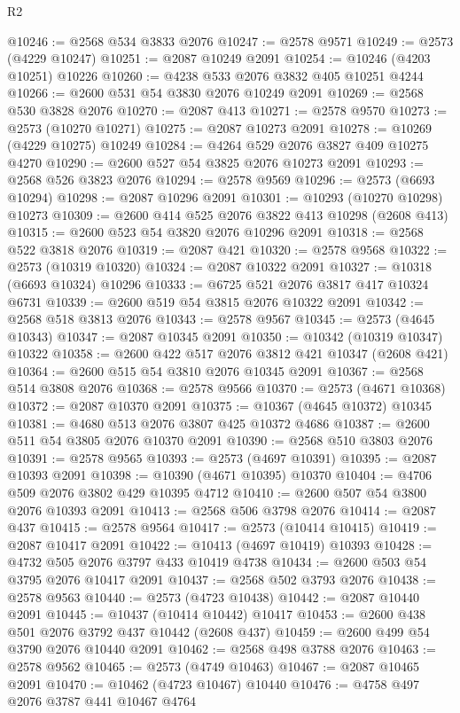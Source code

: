 \begin{lexlean}{R2}
\begin{coremodule}
@10246 := @2568 @534 @3833 @2076
@10247 := @2578 @9571
@10249 := @2573 (@4229 @10247)
@10251 := @2087 @10249 @2091
@10254 := @10246 (@4203 @10251) @10226
@10260 := @4238 @533 @2076 @3832 @405 @10251 @4244
@10266 := @2600 @531 @54 @3830 @2076 @10249 @2091
@10269 := @2568 @530 @3828 @2076
@10270 := @2087 @413
@10271 := @2578 @9570
@10273 := @2573 (@10270 @10271)
@10275 := @2087 @10273 @2091
@10278 := @10269 (@4229 @10275) @10249
@10284 := @4264 @529 @2076 @3827 @409 @10275 @4270
@10290 := @2600 @527 @54 @3825 @2076 @10273 @2091
@10293 := @2568 @526 @3823 @2076
@10294 := @2578 @9569
@10296 := @2573 (@6693 @10294)
@10298 := @2087 @10296 @2091
@10301 := @10293 (@10270 @10298) @10273
@10309 := @2600 @414 @525 @2076 @3822 @413 @10298 (@2608 @413)
@10315 := @2600 @523 @54 @3820 @2076 @10296 @2091
@10318 := @2568 @522 @3818 @2076
@10319 := @2087 @421
@10320 := @2578 @9568
@10322 := @2573 (@10319 @10320)
@10324 := @2087 @10322 @2091
@10327 := @10318 (@6693 @10324) @10296
@10333 := @6725 @521 @2076 @3817 @417 @10324 @6731
@10339 := @2600 @519 @54 @3815 @2076 @10322 @2091
@10342 := @2568 @518 @3813 @2076
@10343 := @2578 @9567
@10345 := @2573 (@4645 @10343)
@10347 := @2087 @10345 @2091
@10350 := @10342 (@10319 @10347) @10322
@10358 := @2600 @422 @517 @2076 @3812 @421 @10347 (@2608 @421)
@10364 := @2600 @515 @54 @3810 @2076 @10345 @2091
@10367 := @2568 @514 @3808 @2076
@10368 := @2578 @9566
@10370 := @2573 (@4671 @10368)
@10372 := @2087 @10370 @2091
@10375 := @10367 (@4645 @10372) @10345
@10381 := @4680 @513 @2076 @3807 @425 @10372 @4686
@10387 := @2600 @511 @54 @3805 @2076 @10370 @2091
@10390 := @2568 @510 @3803 @2076
@10391 := @2578 @9565
@10393 := @2573 (@4697 @10391)
@10395 := @2087 @10393 @2091
@10398 := @10390 (@4671 @10395) @10370
@10404 := @4706 @509 @2076 @3802 @429 @10395 @4712
@10410 := @2600 @507 @54 @3800 @2076 @10393 @2091
@10413 := @2568 @506 @3798 @2076
@10414 := @2087 @437
@10415 := @2578 @9564
@10417 := @2573 (@10414 @10415)
@10419 := @2087 @10417 @2091
@10422 := @10413 (@4697 @10419) @10393
@10428 := @4732 @505 @2076 @3797 @433 @10419 @4738
@10434 := @2600 @503 @54 @3795 @2076 @10417 @2091
@10437 := @2568 @502 @3793 @2076
@10438 := @2578 @9563
@10440 := @2573 (@4723 @10438)
@10442 := @2087 @10440 @2091
@10445 := @10437 (@10414 @10442) @10417
@10453 := @2600 @438 @501 @2076 @3792 @437 @10442 (@2608 @437)
@10459 := @2600 @499 @54 @3790 @2076 @10440 @2091
@10462 := @2568 @498 @3788 @2076
@10463 := @2578 @9562
@10465 := @2573 (@4749 @10463)
@10467 := @2087 @10465 @2091
@10470 := @10462 (@4723 @10467) @10440
@10476 := @4758 @497 @2076 @3787 @441 @10467 @4764

\end{coremodule}
\end{lexlean}
